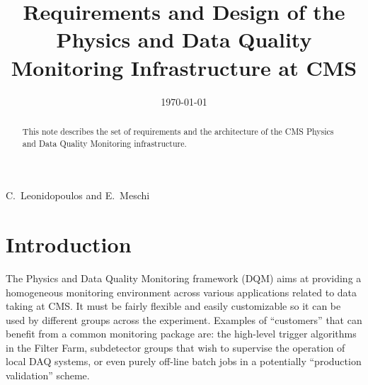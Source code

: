 \documentclass[a4paper]{cmspaper}
\newcommand{\pdfbookmark}[3][1]{}
\begin{document}

\begin{titlepage}

   \date{\today}
\smallskip
\smallskip


  \title{Requirements and Design of the Physics and Data Quality
Monitoring Infrastructure at CMS}

  \begin{Authlist}
    C.~Leonidopoulos and E.~Meschi
  \end{Authlist}


  \begin{abstract}
  This note describes the set of requirements and the architecture of
the CMS Physics and Data Quality Monitoring infrastructure. 
  \end{abstract} 

  
\end{titlepage}

\setcounter{page}{2}%
\linenumbers
\section{Introduction} \label{sec:introduction}
\pdfbookmark[1]{Introduction}{Introduction}
%
The Physics and Data Quality Monitoring framework (DQM) aims at
providing a homogeneous monitoring environment across various
applications related to data taking at CMS. It must be fairly flexible
and easily customizable so it can be used by different groups across the
experiment. Examples of ``customers'' that can benefit from a common monitoring
package are: the high-level trigger algorithms in the Filter Farm,
subdetector groups that wish to supervise the operation of local DAQ
systems, or even purely off-line batch jobs in a potentially
``production validation'' scheme. 
\end{document}
